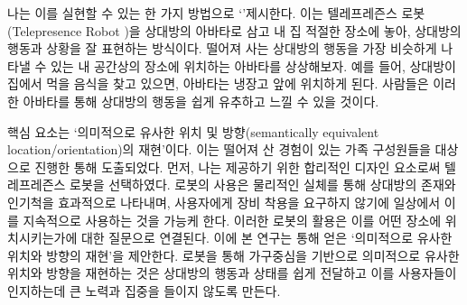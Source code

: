 
나는 이를 실현할 수 있는 한 가지 방법으로 `\approach'\을 제시한다. 이는 텔레프레즌스 로봇(Telepresence Robot \cite{double_robotics})을 상대방의 아바타로 삼고 내 집 적절한 장소에 놓아, 상대방의 행동과 상황을 잘 표현하는 방식이다. 떨어져 사는 상대방의 행동을 가장 비슷하게 나타낼 수 있는 내 공간상의 장소에 위치하는 아바타를 상상해보자. 예를 들어, 상대방이 집에서 먹을 음식을 찾고 있으면, 아바타는 냉장고 앞에 위치하게 된다. 사람들은 이러한 아바타를 통해 상대방의 행동을 쉽게 유추하고 \concept\을 느낄 수 있을 것이다.




 핵심 요소는 `의미적으로 유사한 위치 및 방향(semantically equivalent location/orientation)의 재현'이다.
이는 떨어져 산 경험이 있는 가족 구성원들을 대상으로 진행한 \expWorkshop\을 통해 도출되었다.
먼저, 나는  제공하기 위한 합리적인 디자인 요소로써 텔레프레즌스 로봇을 선택하였다.
로봇의 사용은 물리적인 실체를 통해 상대방의 존재와 인기척을 효과적으로 나타내며, 사용자에게 장비 착용을 요구하지 않기에 일상에서 이를 지속적으로 사용하는 것을 가능케 한다.
이러한 로봇의 활용은 이를 어떤 장소에 위치시키는가에 대한 질문으로 연결된다. 이에 본 연구는  통해 얻은 `의미적으로 유사한 위치와 방향의 재현'을 제안한다.
로봇을 통해 가구중심을 기반으로 의미적으로 유사한 위치와 방향을 재현하는 것은 상대방의 행동과 상태를 쉽게 전달하고 이를 사용자들이 인지하는데 큰 노력과 집중을 들이지 않도록 만든다. 


